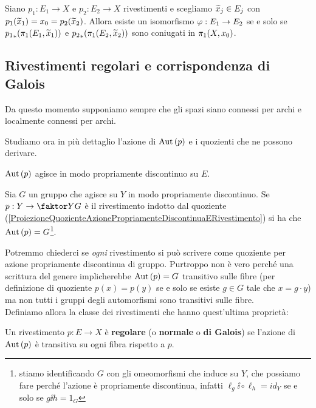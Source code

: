 \begin{multicols*}{2}
\begin{proposition}\label{CaratterizzazioneRivestimentiIsomorfi}
Siano $p_1:E_1\to X$ e $p_2:E_2\to X$ rivestimenti e scegliamo $\widetilde{x}_j\in E_j$ con $p_1(\widetilde{x}_1)=x_0=p_2(\widetilde{x}_2)$. Allora esiste un isomorfismo $\varphi:E_1\to E_2$ se e solo se ${p_1}_\ast(\pi_1(E_1,\widetilde{x}_1))$ e ${p_2}_\ast(\pi_1(E_2,\widetilde{x}_2))$ sono coniugati in $\pi_1(X,x_0)$.
\end{proposition}














\subsection{Rivestimenti regolari e corrispondenza di Galois}
Da questo momento supponiamo sempre che gli spazi siano connessi per archi e localmente connessi per archi.
\bigskip

\noindent
Studiamo ora in pi\`u dettaglio l'azione di $\mathrm{Aut}\,(p)$ e i quozienti che ne possono derivare.

\begin{proposition}\label{AzioneAutomorfismiRivestimentiEPropriamenteDiscontinua}
$\mathrm{Aut}\,(p)$ agisce in modo propriamente discontinuo su $E$.
\end{proposition}

\begin{theorem}\label{PerRivestimentoAzionePropriamenteDiscontinuaAutomorfismiEGruppoCoincidono}
Sia $G$ un gruppo che agisce su $Y$ in modo propriamente discontinuo. Se  $p:Y\to \quot YG$ \`e il rivestimento indotto dal quoziente (\ref{ProiezioneQuozienteAzionePropriamenteDiscontinuaERivestimento}) si ha che $\mathrm{Aut}\,(p)=G$\footnote{stiamo identificando $G$ con gli omeomorfismi che induce su $Y$, che possiamo fare perch\'e l'azione \`e propriamente discontinua, infatti $\ell_g\ii\circ \ell_h=id_Y$ se e solo se $g\ii h=1_G$}.
\end{theorem}

\noindent
Potremmo chiederci se \textit{ogni} rivestimento si pu\`o scrivere come quoziente per azione propriamente discontinua di gruppo. Purtroppo non \`e vero perch\'e una scrittura del genere implicherebbe $\mathrm{Aut}\,(p)=G$ transitivo sulle fibre (per definizione di quoziente $p(x)=p(y)$ se e solo se esiste $g\in G$ tale che $x=g\cdot y$) ma non tutti i gruppi degli automorfismi sono transitivi sulle fibre.\\
Definiamo allora la classe dei rivestimenti che hanno quest'ultima propriet\`a:
\begin{definition}
Un rivestimento $p:E\to X$ \`e \textbf{regolare} (o \textbf{normale} o \textbf{di Galois}) se l'azione di $\mathrm{Aut}\,(p)$ \`e transitiva su ogni fibra rispetto a $p$.
\end{definition}


\end{multicols*}
